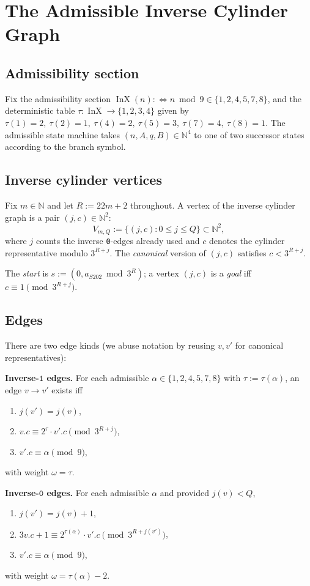 \documentclass[11pt,a4paper]{article}
\theoremstyle{plain}
\theoremstyle{definition}
\theoremstyle{plain}
\newcommand{\NN}{\mathbb{N}}
\newcommand{\aS}{a_{S202}}
\DeclareMathOperator{\InX}{InX}
\begin{document}
\section{The Admissible Inverse Cylinder Graph}\label{sec:graph}

\subsection{Admissibility section}
Fix the admissibility section $\InX(n) :\iff n \bmod 9
\in \{1,2,4,5,7,8\}$, and the deterministic table
$\tau : \InX \to \{1,2,3,4\}$ given by
$\tau(1)=2,\ \tau(2)=1,\ \tau(4)=2,\ \tau(5)=3,\ \tau(7)=4,\ \tau(8)=1$.
The admissible state machine takes $(n,A,q,B) \in \NN^4$ to one of two
successor states according to the branch symbol.

\subsection{Inverse cylinder vertices}
Fix $m \in \NN$ and let $R := 22m + 2$ throughout. A vertex of the
inverse cylinder graph is a pair $(j, c) \in \NN^2$:
\[
  V_{m,Q} := \{(j, c) : 0 \le j \le Q\} \subset \NN^2,
\]
where $j$ counts the inverse \texttt{0}-edges already used and $c$
denotes the cylinder representative modulo $3^{R+j}$. The
\emph{canonical} version of $(j,c)$ satisfies $c < 3^{R+j}$.

The \emph{start} is
$s := (0, \aS \bmod 3^R)$;
a vertex $(j, c)$ is a \emph{goal} iff $c \equiv 1 \pmod{3^{R+j}}$.

\subsection{Edges}
There are two edge kinds (we abuse notation by reusing $v, v'$ for
canonical representatives):

\medskip
\noindent\textbf{Inverse-$\mathtt{1}$ edges.} For each admissible
$\alpha \in \{1,2,4,5,7,8\}$ with $\tau := \tau(\alpha)$, an edge
$v \to v'$ exists iff
\begin{enumerate}
  \item $j(v') = j(v)$,
  \item $v.c \equiv 2^{\tau} \cdot v'.c \pmod{3^{R+j}}$,
  \item $v'.c \equiv \alpha \pmod 9$,
\end{enumerate}
with weight $\omega = \tau$.

\medskip
\noindent\textbf{Inverse-$\mathtt{0}$ edges.}
For each admissible $\alpha$ and provided $j(v) < Q$,
\begin{enumerate}
  \item $j(v') = j(v) + 1$,
  \item $3v.c + 1 \equiv 2^{\tau(\alpha)} \cdot v'.c \pmod{3^{R+j(v')}}$,
  \item $v'.c \equiv \alpha \pmod 9$,
\end{enumerate}
with weight $\omega = \tau(\alpha) - 2$.
\end{document}
